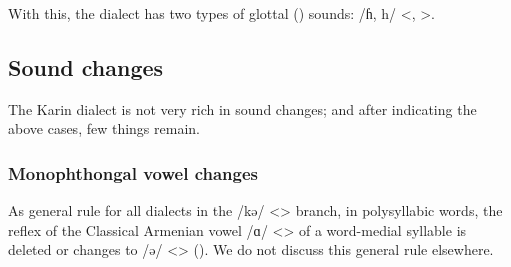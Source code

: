 \begin{table}[H]
	\centering
	\caption{Voiced glottal fricative /ɦ/ <> in the Karin dialect}
	\label{tab:Karin:phono:segment:cons:hh}
\end{table}


With this, the dialect has two types of glottal () sounds: /ɦ, h/ <, >. 


\begin{adjarianpage}\label{page:107}\end{adjarianpage}%

\subsection{Sound changes}

The Karin dialect is not very rich in sound changes; and after indicating the above cases, few things remain. 

\subsubsection{Monophthongal vowel changes}
As general rule for all dialects in the /kə/ <> branch, in polysyllabic words, the reflex of the Classical Armenian vowel /ɑ/ <> of a word-medial syllable is deleted or changes to /ə/ <> (). We do not discuss this general rule elsewhere. 



